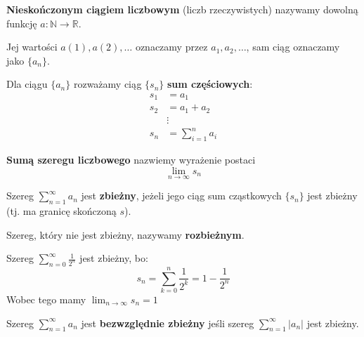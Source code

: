 \begin{definition}
    \textbf{Nieskończonym ciągiem liczbowym} (liczb rzeczywistych) nazywamy dowolną funkcję $a: \mathbb{N} \rightarrow \mathbb{R}$.
    
    Jej wartości \(a(1), a(2), \dots\) oznaczamy przez \(a_1, a_2, \dots\), sam ciąg oznaczamy jako \(\{a_n\}\).
\end{definition}

\begin{definition}
    Dla ciągu \(\{a_n\}\) rozważamy ciąg \(\{s_n\}\) \textbf{sum częściowych}:
    \begin{align*} 
        s_1 &=  a_1 \\ 
        s_2 &=  a_1 + a_2 \\
        &\vdots\\
        s_n &=  \sum_{i=1}^n a_i
    \end{align*}

\end{definition}

\begin{definition}
\textbf{Sumą szeregu liczbowego} nazwiemy wyrażenie postaci
\[
\lim_{n \rightarrow \infty} s_n
\]
\end{definition}

\begin{definition}
    Szereg $\sum_{n=1}^\infty a_n$ jest \textbf{zbieżny}, jeżeli jego ciąg sum cząstkowych $\{s_n\}$ jest zbieżny (tj. ma granicę skończoną \(s\)).
    
    Szereg, który nie jest zbieżny, nazywamy \textbf{rozbieżnym}.
\end{definition}

\begin{example}
    Szereg \(\sum_{n=0}^\infty \frac{1}{2^n}\) jest zbieżny, bo:
    \[
    s_n = \sum_{k=0}^n \frac{1}{2^k} = 1 - \frac{1}{2^n}
    \]
    Wobec tego mamy $\lim_{n\to\infty}{s_n} = 1$
\end{example}

\begin{definition}
    Szereg $\sum_{n=1}^\infty a_n$ jest \textbf{bezwzględnie zbieżny} jeśli szereg $\sum_{n=1}^\infty |a_n|$ jest zbieżny.
\end{definition}